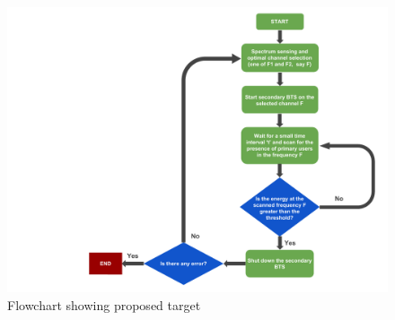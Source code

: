 \begin{figure}[h]
\centering
\includegraphics[width=1\textwidth]{workFlowchart}
\caption{Flowchart showing proposed target}
\label{workFlowchart}
\end{figure}

